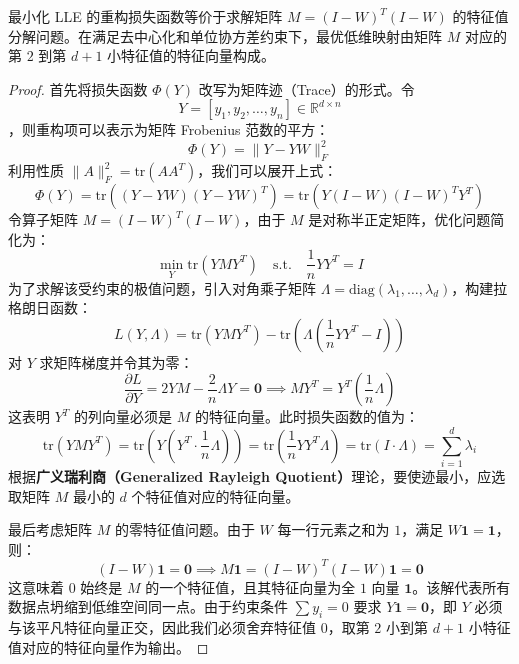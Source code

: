 \begin{theorem}
最小化 LLE 的重构损失函数等价于求解矩阵 $M = (I-W)^T(I-W)$ 的特征值分解问题。在满足去中心化和单位协方差约束下，最优低维映射由矩阵 $M$ 对应的第 $2$ 到第 $d+1$ 小特征值的特征向量构成。
\end{theorem}

\begin{proof}
首先将损失函数 $\Phi(Y)$ 改写为矩阵迹（Trace）的形式。令 $$Y = [y_1, y_2, \dots, y_n] \in \mathbb{R}^{d \times n}$$，则重构项可以表示为矩阵 Frobenius 范数的平方：
\begin{equation}
    \Phi(Y) = \| Y - YW \|_F^2
\end{equation}
利用性质 $\|A\|_F^2 = \text{tr}(AA^T)$，我们可以展开上式：
\begin{equation}
    \Phi(Y) = \text{tr}\left( (Y-YW)(Y-YW)^T \right) = \text{tr}\left( Y(I-W)(I-W)^T Y^T \right)
\end{equation}
令算子矩阵 $M = (I-W)^T(I-W)$，由于 $M$ 是对称半正定矩阵，优化问题简化为：
\begin{equation}
    \min_{Y} \text{tr}(YMY^T) \quad \text{s.t.} \quad \frac{1}{n}YY^T = I
\end{equation}
为了求解该受约束的极值问题，引入对角乘子矩阵 $\Lambda = \text{diag}(\lambda_1, \dots, \lambda_d)$，构建拉格朗日函数：
\begin{equation}
    L(Y, \Lambda) = \text{tr}(YMY^T) - \text{tr}\left( \Lambda \left( \frac{1}{n}YY^T - I \right) \right)
\end{equation}
对 $Y$ 求矩阵梯度并令其为零：
\begin{equation}
    \frac{\partial L}{\partial Y} = 2YM - \frac{2}{n}\Lambda Y = \mathbf{0} \implies MY^T = Y^T \left( \frac{1}{n}\Lambda \right)
\end{equation}
这表明 $Y^T$ 的列向量必须是 $M$ 的特征向量。此时损失函数的值为：
\begin{equation}
    \text{tr}(YMY^T) = \text{tr}\left( Y(Y^T \cdot \frac{1}{n}\Lambda) \right) = \text{tr}\left( \frac{1}{n}YY^T \Lambda \right) = \text{tr}(I \cdot \Lambda) = \sum_{i=1}^d \lambda_i
\end{equation}
根据\textbf{广义瑞利商（Generalized Rayleigh Quotient）}理论，要使迹最小，应选取矩阵 $M$ 最小的 $d$ 个特征值对应的特征向量。

最后考虑矩阵 $M$ 的零特征值问题。由于 $W$ 每一行元素之和为 $1$，满足 $W\mathbf{1} = \mathbf{1}$，则：
\begin{equation}
    (I-W)\mathbf{1} = \mathbf{0} \implies M\mathbf{1} = (I-W)^T(I-W)\mathbf{1} = \mathbf{0}
\end{equation}
这意味着 $0$ 始终是 $M$ 的一个特征值，且其特征向量为全 $1$ 向量 $\mathbf{1}$。该解代表所有数据点坍缩到低维空间同一点。由于约束条件 $\sum y_i = 0$ 要求 $Y\mathbf{1} = \mathbf{0}$，即 $Y$ 必须与该平凡特征向量正交，因此我们必须舍弃特征值 $0$，取第 $2$ 小到第 $d+1$ 小特征值对应的特征向量作为输出。
\end{proof}

